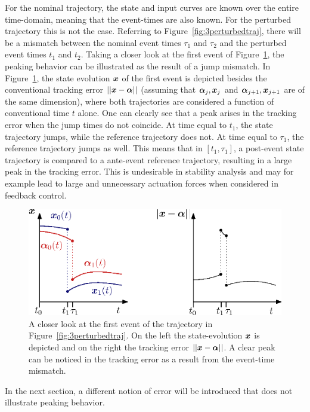 \documentclass[../DC2017114Bouma.tex]{subfiles}
\begin{document}
For the nominal trajectory, the state and input curves are known over the entire time-domain, meaning that the event-times are also known. For the perturbed trajectory this is not the case. Referring to Figure~\ref{fig:3perturbedtraj}, there will be a mismatch between the nominal event times $\tau_1$ and $\tau_2$ and the perturbed event times $t_1$ and $t_2$. Taking a closer look at the first event of Figure~\ref{fig:3peakerror}, the peaking behavior can be illustrated as the result of a jump mismatch. In Figure~\ref{fig:3peakerror}, the state evolution ${\boldsymbol{x}}$ of the first event is depicted besides the conventional tracking error $||{\boldsymbol{x}}-\boldsymbol{\alpha}||$ (assuming that $\boldsymbol{\alpha}_j,{\boldsymbol{x}}_j$ and $\boldsymbol{\alpha}_{j+1},{\boldsymbol{x}}_{j+1}$ are of the same dimension), where both trajectories are considered a function of conventional time $t$ alone. One can clearly see that a peak arises in the tracking error when the jump times do not coincide. At time equal to $t_1$, the state trajectory jumps, while the reference trajectory does not. At time equal to $\tau_1$, the reference trajectory jumps as well. This means that in $[t_1,\tau_1]$, a post-event state trajectory is compared to a ante-event reference trajectory, resulting in a large peak in the tracking error. This is undesirable in stability analysis and may for example lead to large and unnecessary actuation forces when considered in feedback control.

\begin{figure}[bt!]
\centering
\includegraphics[width=.66\textwidth]{peakerror.eps}\caption{A closer look at the first event of the trajectory in Figure~\ref{fig:3perturbedtraj}. On the left the state-evolution ${\boldsymbol{x}}$ is depicted and on the right the tracking error $||{\boldsymbol{x}}-\boldsymbol{\alpha}||$. A clear peak can be noticed in the tracking error as a result from the event-time mismatch.} \label{fig:3peakerror}
\end{figure}

In the next section, a different notion of error will be introduced that does not illustrate peaking behavior.
%
%
%
%
%
\end{document}
